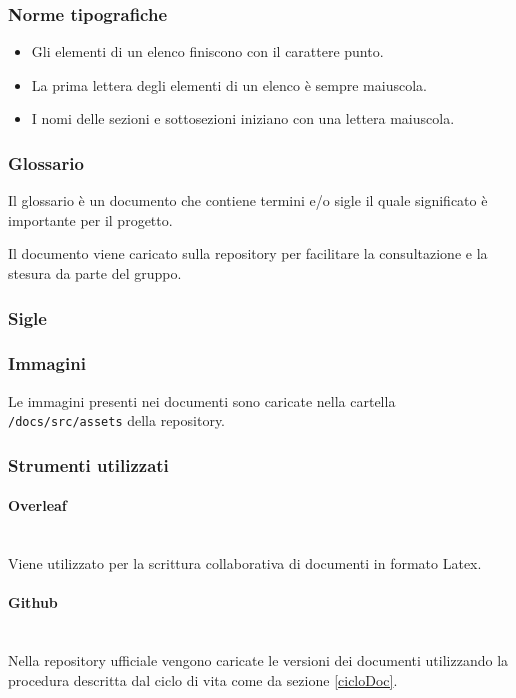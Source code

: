 \documentclass{article}
\begin{document}
\subsubsection{Norme tipografiche}
\begin{itemize}
    \item Gli elementi di un elenco finiscono con il carattere punto.
    \item La prima lettera degli elementi di un elenco è sempre maiuscola.
    \item I nomi delle sezioni e sottosezioni iniziano con una lettera maiuscola.
\end{itemize}

\subsubsection{Glossario}
Il glossario è un documento che contiene termini e/o sigle il quale significato è importante per il progetto.

Il documento viene caricato sulla repository per facilitare la consultazione e la stesura da parte del gruppo.

\subsubsection{Sigle}

\subsubsection{Immagini}
Le immagini presenti nei documenti sono caricate nella cartella \texttt{/docs/src/assets} della repository.


\subsubsection{Strumenti utilizzati}
\paragraph{Overleaf}~\\
Viene utilizzato per la scrittura collaborativa di documenti in formato Latex.
\paragraph{Github}~\\
Nella repository ufficiale vengono caricate le versioni dei documenti utilizzando la procedura descritta dal ciclo di vita come da sezione \ref{cicloDoc}.
\end{document}

